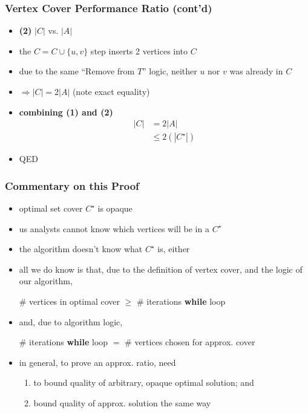 \documentclass{beamer}
\begin{document}
      \begin{frame} \frametitle{Vertex Cover Performance Ratio (cont'd)}
      \begin{itemize}
        \item \textbf{(2)} $|C|$ vs. $|A|$
        \item the $C = C \cup \{u, v \}$ step inserts 2 vertices into $C$
        \item  due to the same ``Remove from $T$'' logic, neither $u$ nor $v$ was already
          in $C$
        \item $\Rightarrow |C| = 2|A|$ (note exact equality)
        \item \textbf{combining (1) and (2)}
        \begin{align*}
          |C| &= 2|A| \\
          & \leq 2(|C^\star|)
        \end{align*}
        \item QED
      \end{itemize}
      \end{frame}
      
      \begin{frame} \frametitle{Commentary on this Proof}
      \begin{itemize}
        \item optimal set cover $C^\star$ is opaque
        \item us analysts cannot know which vertices will be in a $C^\star$
        \item the algorithm doesn't know what $C^\star$ is, either
        \item all we do know is that, due to the definition of vertex cover, and
          the logic of our algorithm,
          \begin{center}
            \# vertices in optimal cover $\geq$ \# iterations \textbf{while} loop
          \end{center}
        \item and, due to algorithm logic,
        \begin{center}
            \# iterations \textbf{while} loop $=$ \# vertices chosen for approx. cover
        \end{center}
        \item in general, to prove an approx. ratio, need
        \begin{enumerate}
          \item to bound quality of arbitrary, opaque optimal solution; and
          \item bound quality of approx. solution the same way
        \end{enumerate}
      \end{itemize}
      \end{frame}
\end{document}
